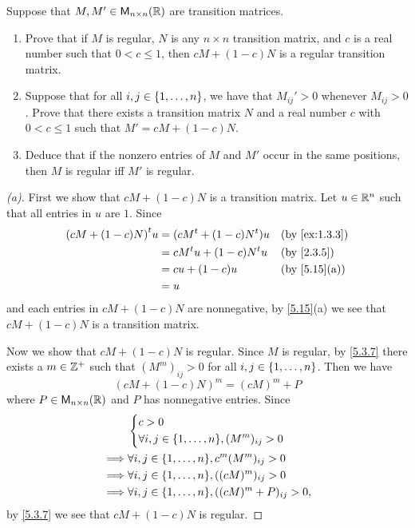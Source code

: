 \setcounter{ex}{18}
\begin{ex}\label{ex:5.3.19}
	Suppose that \(M, M' \in \ms[n][n][\R]\) are transition matrices.
	\begin{enumerate}
		\item Prove that if \(M\) is regular, \(N\) is any \(n \times n\) transition matrix, and \(c\) is a real number such that \(0 < c \leq 1\), then \(cM + (1 - c)N\) is a regular transition matrix.
		\item Suppose that for all \(i, j \in \left\lbrace1, \dots, n\right\rbrace\), we have that \(M_{i j}' > 0\) whenever \(M_{i j} > 0\).
		      Prove that there exists a transition matrix \(N\) and a real number \(c\) with \(0 < c \leq 1\) such that \(M' = cM + (1 - c)N\).
		\item Deduce that if the nonzero entries of \(M\) and \(M'\) occur in the same positions, then \(M\) is regular iff \(M'\) is regular.
	\end{enumerate}
\end{ex}

\begin{proof}[(a)]
	First we show that \(cM + (1 - c)N\) is a transition matrix.
	Let \(u \in \mathbb{R}^n\) such that all entries in \(u\) are \(1\).
	Since
	\begin{align*}
		\tp{(cM + (1 - c)N)} u & = (c \tp{M} + (1 - c) \tp{N}) u &  & \by{ex:1.3.3} \\
		                       & = c \tp{M} u + (1 - c) \tp{N} u &  & \by{2.3.5}    \\
		                       & = c u + (1 - c) u               &  & \by{5.15}[a]  \\
		                       & = u
	\end{align*}
	and each entries in \(cM + (1 - c)N\) are nonnegative, by \cref{5.15}(a) we see that \(cM + (1 - c)N\) is a transition matrix.

	Now we show that \(cM + (1 - c)N\) is regular.
	Since \(M\) is regular, by \cref{5.3.7} there exists a \(m \in \mathbb{Z}^+\) such that \((M^m)_{i j} > 0\) for all \(i, j \in \left\lbrace1, \dots, n\right\rbrace\).
	Then we have
	\[
		(cM + (1 - c)N)^m = (cM)^m + P
	\]
	where \(P \in \ms[n][n][\R]\) and \(P\) has nonnegative entries.
	Since
	\begin{align*}
		         & \begin{dcases}
			           c > 0 \\
			           \forall i, j \in \set{1, \dots, n}, (M^m)_{i j} > 0
		           \end{dcases}          \\
		\implies & \forall i, j \in \set{1, \dots, n}, c^m (M^m)_{i j} > 0     \\
		\implies & \forall i, j \in \set{1, \dots, n}, ((cM)^m)_{i j} > 0      \\
		\implies & \forall i, j \in \set{1, \dots, n}, ((cM)^m + P)_{i j} > 0,
	\end{align*}
	by \cref{5.3.7} we see that \(cM + (1 - c)N\) is regular.
\end{proof}

